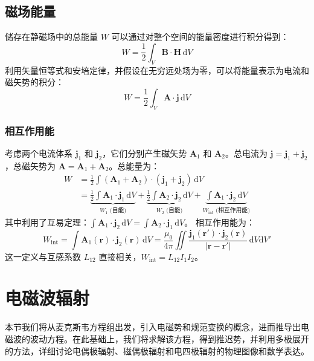 \documentclass[fontset=none]{ctexart}
\begin{document}
\subsection{磁场能量}
储存在静磁场中的总能量 $W$ 可以通过对整个空间的能量密度进行积分得到：
\begin{equation}
    W = \frac{1}{2} \int_V \bm{B} \cdot \bm{H} \, \mathrm{d}V
\end{equation}
利用矢量恒等式和安培定律，并假设在无穷远处场为零，可以将能量表示为电流和磁矢势的积分：
\begin{equation}
    W = \frac{1}{2} \int_V \bm{A} \cdot \bm{j} \, \mathrm{d}V
\end{equation}

\subsubsection{相互作用能}
考虑两个电流体系 $\bm{j}_1$ 和 $\bm{j}_2$，它们分别产生磁矢势 $\bm{A}_1$ 和 $\bm{A}_2$。总电流为 $\bm{j} = \bm{j}_1 + \bm{j}_2$，总磁矢势为 $\bm{A} = \bm{A}_1 + \bm{A}_2$。总能量为：
\begin{equation}
\begin{aligned}
    W &= \frac{1}{2} \int (\bm{A}_1 + \bm{A}_2) \cdot (\bm{j}_1 + \bm{j}_2) \, \mathrm{d}V \\
    &= \underbrace{\frac{1}{2} \int \bm{A}_1 \cdot \bm{j}_1 \, \mathrm{d}V}_{W_1 \text{ (自能)}} + \underbrace{\frac{1}{2} \int \bm{A}_2 \cdot \bm{j}_2 \, \mathrm{d}V}_{W_2 \text{ (自能)}} + \underbrace{\int \bm{A}_1 \cdot \bm{j}_2 \, \mathrm{d}V}_{W_{\text{int}} \text{ (相互作用能)}}
\end{aligned}
\end{equation}
其中利用了互易定理：$\int \bm{A}_1 \cdot \bm{j}_2 \, \mathrm{d}V = \int \bm{A}_2 \cdot \bm{j}_1 \, \mathrm{d}V$。
相互作用能为：
\begin{equation}
    W_{\text{int}} = \int \bm{A}_1(\bm{r}) \cdot \bm{j}_2(\bm{r}) \, \mathrm{d}V = \frac{\mu_0}{4\pi} \iint \frac{\bm{j}_1(\bm{r'}) \cdot \bm{j}_2(\bm{r})}{|\bm{r} - \bm{r'}|} \, \mathrm{d}V \mathrm{d}V'
\end{equation}
这一定义与互感系数 $L_{12}$ 直接相关，$W_{\text{int}} = L_{12} I_1 I_2$。

\section{电磁波辐射}
本节我们将从麦克斯韦方程组出发，引入电磁势和规范变换的概念，进而推导出电磁波的波动方程。在此基础上，我们将求解该方程，得到推迟势，并利用多极展开的方法，详细讨论电偶极辐射、磁偶极辐射和电四极辐射的物理图像和数学表达。
\end{document}
